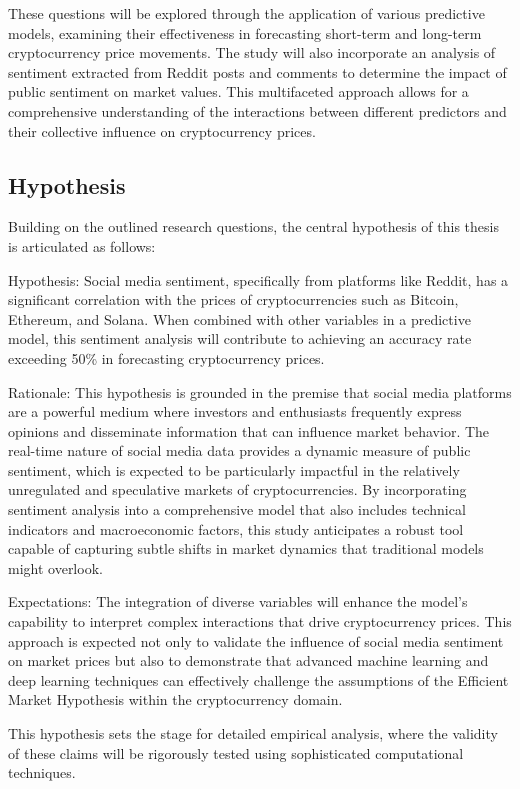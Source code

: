 These questions will be explored through the application of various predictive models, examining their effectiveness in forecasting short-term and long-term cryptocurrency price movements. The study will also incorporate an analysis of sentiment extracted from Reddit posts and comments to determine the impact of public sentiment on market values. This multifaceted approach allows for a comprehensive understanding of the interactions between different 
predictors and their collective influence on cryptocurrency prices.

\subsection{Hypothesis}
Building on the outlined research questions, the central hypothesis of this thesis is articulated as follows:

Hypothesis: Social media sentiment, specifically from platforms like Reddit, has a significant correlation with the prices of cryptocurrencies 
such as Bitcoin, Ethereum, and Solana. When combined with other variables in a predictive model, this sentiment analysis will contribute to 
achieving an accuracy rate exceeding 50\% in forecasting cryptocurrency prices.

Rationale: This hypothesis is grounded in the premise that social media platforms are a powerful medium where investors and enthusiasts 
frequently express opinions and disseminate information that can influence market behavior. The real-time nature of social media data provides 
a dynamic measure of public sentiment, which is expected to be particularly impactful in the relatively unregulated and speculative markets of 
cryptocurrencies. By incorporating sentiment analysis into a comprehensive model that also includes technical indicators and macroeconomic factors,
this study anticipates a robust tool capable of capturing subtle shifts in market dynamics that traditional models might overlook.

Expectations: The integration of diverse variables will enhance the model's capability to interpret complex interactions that drive 
cryptocurrency prices. This approach is expected not only to validate the influence of social media sentiment on market prices but also to 
demonstrate that advanced machine learning and deep learning techniques can effectively challenge the assumptions of the 
Efficient Market Hypothesis within the cryptocurrency domain.

This hypothesis sets the stage for detailed empirical analysis, where the validity of these claims will be rigorously tested using 
sophisticated computational techniques.

